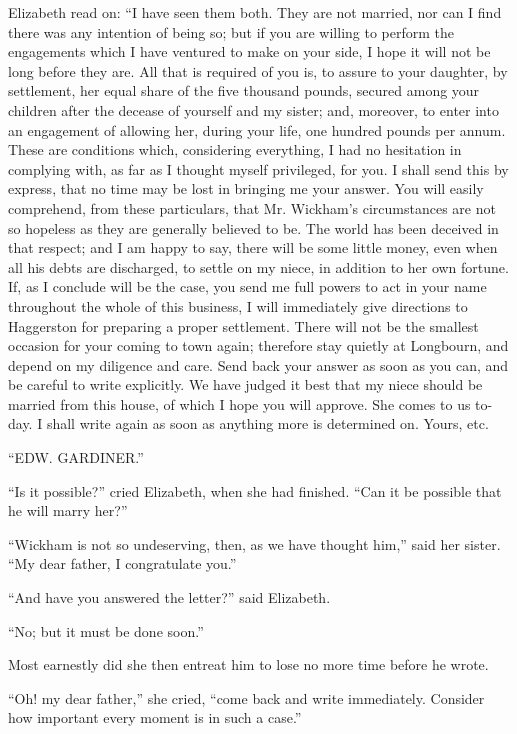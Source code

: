 Elizabeth read on: ``I have seen them both. They are not married, nor can I find there was any intention of being so; but if you are willing to perform the engagements which I have ventured to make on your side, I hope it will not be long before they are. All that is required of you is, to assure to your daughter, by settlement, her equal share of the five thousand pounds, secured among your children after the decease of yourself and my sister; and, moreover, to enter into an engagement of allowing her, during your life, one hundred pounds per annum. These are conditions which, considering everything, I had no hesitation in complying with, as far as I thought myself privileged, for you. I shall send this by express, that no time may be lost in bringing me your answer. You will easily comprehend, from these particulars, that Mr. Wickham's circumstances are not so hopeless as they are generally believed to be. The world has been deceived in that respect; and I am happy to say, there will be some little money, even when all his debts are discharged, to settle on my niece, in addition to her own fortune. If, as I conclude will be the case, you send me full powers to act in your name throughout the whole of this business, I will immediately give directions to Haggerston for preparing a proper settlement. There will not be the smallest occasion for your coming to town again; therefore stay quietly at Longbourn, and depend on my diligence and care. Send back your answer as soon as you can, and be careful to write explicitly. We have judged it best that my niece should be married from this house, of which I hope you will approve. She comes to us to-day. I shall write again as soon as anything more is determined on. Yours, etc.

``EDW. GARDINER.''

``Is it possible?'' cried Elizabeth, when she had finished. ``Can it be possible that he will marry her?''

``Wickham is not so undeserving, then, as we have thought him,'' said her sister. ``My dear father, I congratulate you.''

``And have you answered the letter?'' said Elizabeth.

``No; but it must be done soon.''

Most earnestly did she then entreat him to lose no more time before he wrote.

``Oh! my dear father,'' she cried, ``come back and write immediately. Consider how important every moment is in such a case.''

